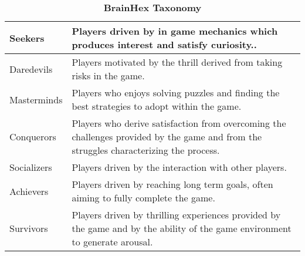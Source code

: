 \begin{table}[h]
\caption{\textbf{BrainHex Taxonomy}}
\label{nacke}
\begin{tabularx}{\textwidth}{|l|X|}
\hline
Seekers     & Players driven by in game mechanics which produces interest and satisfy curiosity..                                                    \\ \hline
Daredevils  & Players motivated by the thrill derived from taking risks in the game.                                                                 \\ \hline
Masterminds & Players who enjoys solving puzzles and finding the best strategies to adopt within the game.                                           \\ \hline
Conquerors  & Players who derive satisfaction from overcoming the challenges provided by the game and from the struggles characterizing the process. \\ \hline
Socializers & Players driven by the interaction with other players.                                                                                  \\ \hline
Achievers   & Players driven by reaching long term goals, often aiming to fully complete the game.                                                   \\ \hline
Survivors   & Players driven by thrilling experiences provided by the game and by the ability of the game environment to generate arousal.           \\ \hline
\end{tabularx}
\end{table}